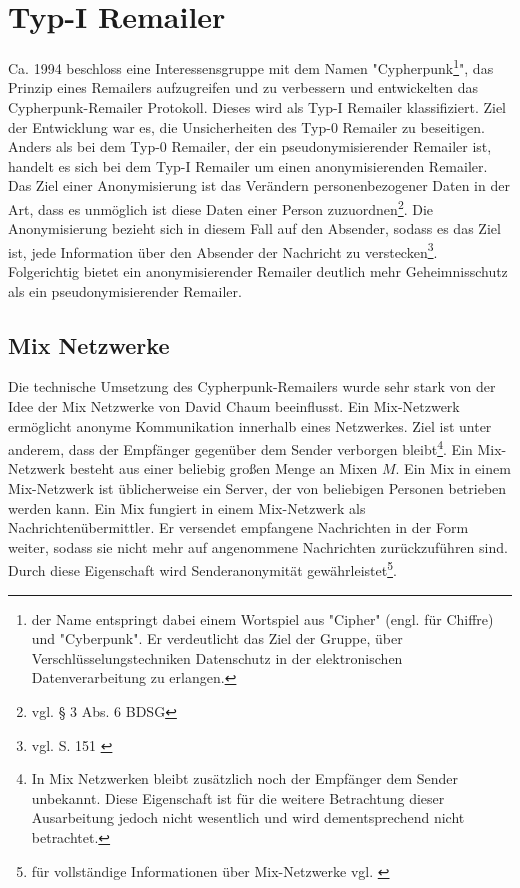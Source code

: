 \chapter{Typ-I Remailer}
Ca. 1994 beschloss eine Interessensgruppe mit dem Namen "Cypherpunk\footnote{der Name entspringt dabei einem Wortspiel aus "Cipher" (engl. für Chiffre) und "Cyberpunk". Er verdeutlicht das Ziel der Gruppe, über Verschlüsselungstechniken Datenschutz in der elektronischen Datenverarbeitung zu erlangen.}", das Prinzip eines Remailers aufzugreifen und zu verbessern und entwickelten das Cypherpunk-Remailer Protokoll. Dieses wird als Typ-I Remailer klassifiziert. Ziel der Entwicklung war es, die Unsicherheiten des Typ-0 Remailer zu beseitigen. 
Anders als bei dem Typ-0 Remailer, der ein pseudonymisierender Remailer ist, handelt es sich bei dem Typ-I Remailer um einen anonymisierenden Remailer. Das Ziel einer Anonymisierung ist das Verändern personenbezogener Daten in der Art, dass es unmöglich ist diese Daten einer Person zuzuordnen\footnote {vgl. § 3 Abs. 6 BDSG}.
Die Anonymisierung bezieht sich in diesem Fall auf den Absender, sodass es das Ziel ist, jede Information über den Absender der Nachricht zu verstecken\footnote{vgl. S. 151 \cite{horster2013datenschutz}}. Folgerichtig bietet ein anonymisierender Remailer deutlich mehr Geheimnisschutz als ein pseudonymisierender Remailer. 


\section{Mix Netzwerke}
Die technische Umsetzung des Cypherpunk-Remailers wurde sehr stark von der Idee der Mix Netzwerke von David Chaum beeinflusst. Ein Mix-Netzwerk ermöglicht anonyme Kommunikation innerhalb eines Netzwerkes. Ziel ist unter anderem, dass der Empfänger gegenüber dem Sender verborgen bleibt\footnote{In Mix Netzwerken bleibt zusätzlich noch der Empfänger dem Sender unbekannt. Diese Eigenschaft ist für die weitere Betrachtung dieser Ausarbeitung jedoch nicht wesentlich und wird dementsprechend nicht betrachtet.}.
Ein Mix-Netzwerk besteht aus einer beliebig großen Menge an Mixen \(M\). Ein Mix in einem Mix-Netzwerk ist üblicherweise ein Server, der von beliebigen Personen betrieben werden kann. Ein Mix fungiert in einem Mix-Netzwerk als Nachrichtenübermittler. Er versendet empfangene Nachrichten in der Form weiter, sodass sie nicht mehr auf angenommene Nachrichten zurückzuführen sind. Durch diese Eigenschaft wird Senderanonymität gewährleistet\footnote{für vollständige Informationen über Mix-Netzwerke vgl.  \cite{chaum1981}}.

